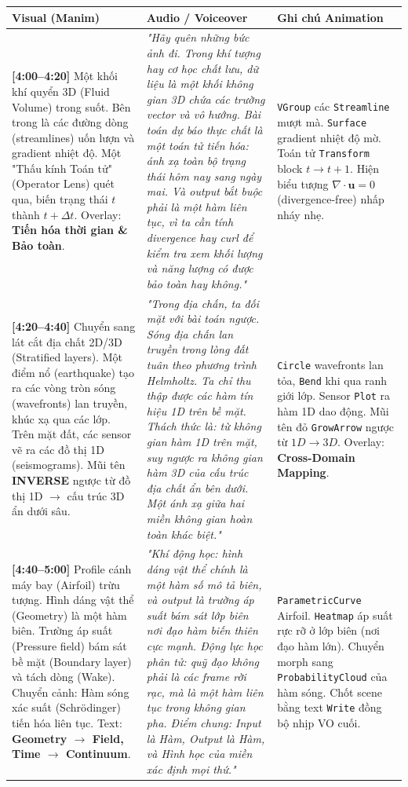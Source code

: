 \noindent 
\setlength{\tabcolsep}{4pt}
\renewcommand{\arraystretch}{1.2}
\begin{tabularx}{\textwidth}{|p{3.6cm}|>{\RaggedRight\arraybackslash}X|p{4.6cm}|}
\hline
\textbf{Visual (Manim)} & \textbf{Audio / Voiceover} & \textbf{Ghi chú Animation} \\ \hline
\textbf{[4:00--4:20]} \newline 
Một khối khí quyển 3D (Fluid Volume) trong suốt. Bên trong là các đường dòng (streamlines) uốn lượn và gradient nhiệt độ. 
Một "Thấu kính Toán tử" (Operator Lens) quét qua, biến trạng thái $t$ thành $t+\Delta t$. 
Overlay: \textbf{Tiến hóa thời gian \& Bảo toàn}.
& \textit{"Hãy quên những bức ảnh đi. Trong khí tượng hay cơ học chất lưu, dữ liệu là một khối không gian 3D chứa các trường vector và vô hướng. Bài toán dự báo thực chất là một toán tử tiến hóa: ánh xạ toàn bộ trạng thái hôm nay sang ngày mai. Và output bắt buộc phải là một hàm liên tục, vì ta cần tính divergence hay curl để kiểm tra xem khối lượng và năng lượng có được bảo toàn hay không."} 
& \texttt{VGroup} các \texttt{Streamline} mượt mà. 
\texttt{Surface} gradient nhiệt độ mờ. 
Toán tử \texttt{Transform} block $t \to t+1$. 
Hiện biểu tượng $\nabla \cdot \mathbf{u} = 0$ (divergence-free) nhấp nháy nhẹ. \\ \hline
\textbf{[4:20--4:40]} \newline 
Chuyển sang lát cắt địa chất 2D/3D (Stratified layers). 
Một điểm nổ (earthquake) tạo ra các vòng tròn sóng (wavefronts) lan truyền, khúc xạ qua các lớp. 
Trên mặt đất, các sensor vẽ ra các đồ thị 1D (seismograms). 
Mũi tên \textbf{INVERSE} ngược từ đồ thị 1D $\to$ cấu trúc 3D ẩn dưới sâu.
& \textit{"Trong địa chấn, ta đối mặt với bài toán ngược. Sóng địa chấn lan truyền trong lòng đất tuân theo phương trình Helmholtz. Ta chỉ thu thập được các hàm tín hiệu 1D trên bề mặt. Thách thức là: từ không gian hàm 1D trên mặt, suy ngược ra không gian hàm 3D của cấu trúc địa chất ẩn bên dưới. Một ánh xạ giữa hai miền không gian hoàn toàn khác biệt."} 
& \texttt{Circle} wavefronts lan tỏa, \texttt{Bend} khi qua ranh giới lớp.
Sensor \texttt{Plot} ra hàm 1D dao động.
Mũi tên đỏ \texttt{GrowArrow} ngược từ $1D \to 3D$. Overlay: \textbf{Cross-Domain Mapping}. \\ \hline
\textbf{[4:40--5:00]} \newline 
Profile cánh máy bay (Airfoil) trừu tượng. 
Hình dáng vật thể (Geometry) là một hàm biên. 
Trường áp suất (Pressure field) bám sát bề mặt (Boundary layer) và tách dòng (Wake).
Chuyển cảnh: Hàm sóng xác suất (Schrödinger) tiến hóa liên tục.
Text: \textbf{Geometry $\to$ Field, Time $\to$ Continuum}.
& \textit{"Khí động học: hình dáng vật thể chính là một hàm số mô tả biên, và output là trường áp suất bám sát lớp biên nơi đạo hàm biến thiên cực mạnh. Động lực học phân tử: quỹ đạo không phải là các frame rời rạc, mà là một hàm liên tục trong không gian pha. Điểm chung: Input là Hàm, Output là Hàm, và Hình học của miền xác định mọi thứ."}
& \texttt{ParametricCurve} Airfoil. 
\texttt{Heatmap} áp suất rực rỡ ở lớp biên (nơi đạo hàm lớn).
Chuyển morph sang \texttt{ProbabilityCloud} của hàm sóng.
Chốt scene bằng text \texttt{Write} đồng bộ nhịp VO cuối. \\ \hline
\end{tabularx}

